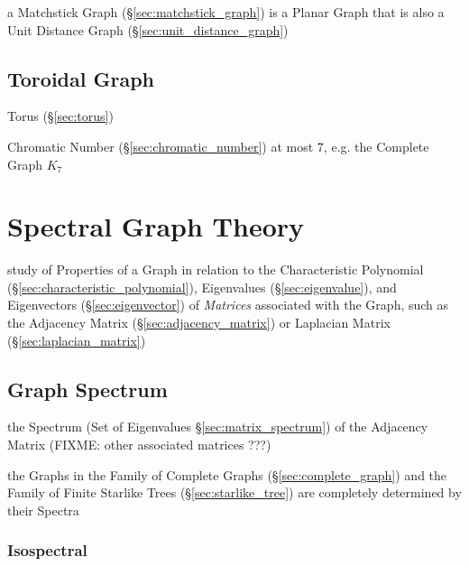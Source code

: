 a Matchstick Graph (\S\ref{sec:matchstick_graph}) is a Planar Graph that
is also a Unit Distance Graph (\S\ref{sec:unit_distance_graph})



\subsection{Toroidal Graph}\label{sec:toroidal_graph}

Torus (\S\ref{sec:torus})

Chromatic Number (\S\ref{sec:chromatic_number}) at most $7$, e.g. the Complete
Graph $K_7$



\section{Spectral Graph Theory}\label{sec:spectral_graph_theory}

study of Properties of a Graph in relation to the Characteristic Polynomial
(\S\ref{sec:characteristic_polynomial}), Eigenvalues (\S\ref{sec:eigenvalue}),
and Eigenvectors (\S\ref{sec:eigenvector}) of \emph{Matrices} associated with
the Graph, such as the Adjacency Matrix (\S\ref{sec:adjacency_matrix}) or
Laplacian Matrix (\S\ref{sec:laplacian_matrix})



\subsection{Graph Spectrum}\label{sec:graph_spectrum}

the Spectrum (Set of Eigenvalues \S\ref{sec:matrix_spectrum}) of the Adjacency
Matrix (FIXME: other associated matrices ???)

the Graphs in the Family of Complete Graphs (\S\ref{sec:complete_graph}) and
the Family of Finite Starlike Trees (\S\ref{sec:starlike_tree}) are completely
determined by their Spectra



\subsubsection{Isospectral}\label{sec:isospectrum}

